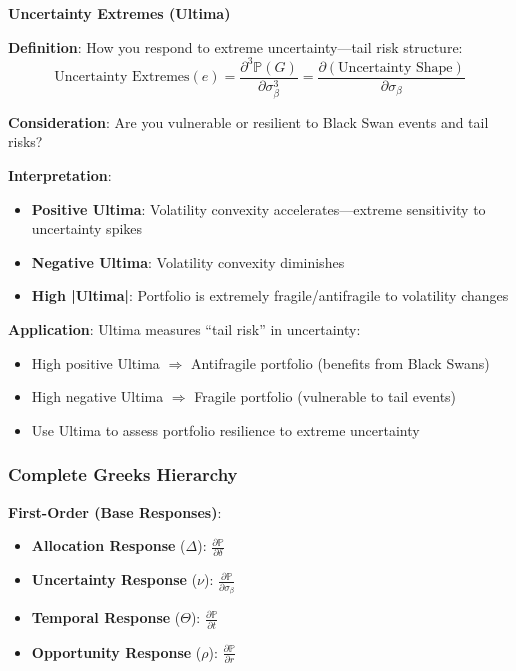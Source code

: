 \textbf{Uncertainty Extremes (Ultima)}

\textbf{Definition}: How you respond to extreme uncertainty---tail risk structure:
\[ \text{Uncertainty Extremes}(e) = \frac{\partial^3 \mathbb{P}(G)}{\partial \sigma_\beta^3} = \frac{\partial (\text{Uncertainty Shape})}{\partial \sigma_\beta} \]

\textbf{Consideration}: Are you vulnerable or resilient to Black Swan events and tail risks?

\textbf{Interpretation}:
\begin{itemize}
\item \textbf{Positive Ultima}: Volatility convexity accelerates---extreme sensitivity to uncertainty spikes
\item \textbf{Negative Ultima}: Volatility convexity diminishes
\item \textbf{High |Ultima|}: Portfolio is extremely fragile/antifragile to volatility changes
\end{itemize}

\textbf{Application}: Ultima measures ``tail risk'' in uncertainty:
\begin{itemize}
\item High positive Ultima $\Rightarrow$ Antifragile portfolio (benefits from Black Swans)
\item High negative Ultima $\Rightarrow$ Fragile portfolio (vulnerable to tail events)
\item Use Ultima to assess portfolio resilience to extreme uncertainty
\end{itemize}

\subsubsection{Complete Greeks Hierarchy}

\textbf{First-Order (Base Responses)}:
\begin{itemize}
\item \textbf{Allocation Response} ($\Delta$): $\frac{\partial \mathbb{P}}{\partial \delta}$
\item \textbf{Uncertainty Response} ($\nu$): $\frac{\partial \mathbb{P}}{\partial \sigma_\beta}$
\item \textbf{Temporal Response} ($\Theta$): $\frac{\partial \mathbb{P}}{\partial t}$
\item \textbf{Opportunity Response} ($\rho$): $\frac{\partial \mathbb{P}}{\partial r}$
\end{itemize}

